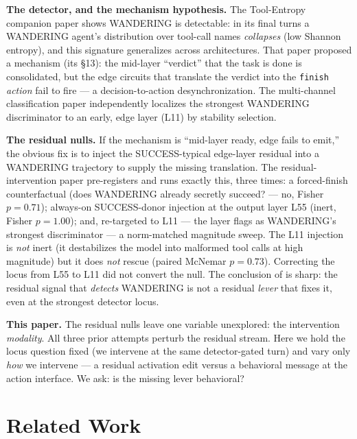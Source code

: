 \documentclass[11pt]{article}
\begin{document}
\textbf{The detector, and the mechanism hypothesis.} The Tool-Entropy companion paper \cite{tool_entropy} shows WANDERING is detectable: in its final turns a WANDERING agent's distribution over tool-call names \emph{collapses} (low Shannon entropy), and this signature generalizes across architectures. That paper proposed a mechanism (its \S13): the mid-layer ``verdict'' that the task is done is consolidated, but the edge circuits that translate the verdict into the \texttt{finish} \emph{action} fail to fire --- a decision-to-action desynchronization. The multi-channel classification paper \cite{multichannel} independently localizes the strongest WANDERING discriminator to an early, edge layer (L11) by stability selection.

\textbf{The residual nulls.} If the mechanism is ``mid-layer ready, edge fails to emit,'' the obvious fix is to inject the SUCCESS-typical edge-layer residual into a WANDERING trajectory to supply the missing translation. The residual-intervention paper \cite{residual_nulls} pre-registers and runs exactly this, three times: a forced-finish counterfactual (does WANDERING already secretly succeed? --- no, Fisher $p=0.71$); always-on SUCCESS-donor injection at the output layer L55 (inert, Fisher $p=1.00$); and, re-targeted to L11 --- the layer \cite{multichannel} flags as WANDERING's strongest discriminator --- a norm-matched magnitude sweep. The L11 injection is \emph{not} inert (it destabilizes the model into malformed tool calls at high magnitude) but it does \emph{not} rescue (paired McNemar $p=0.73$). Correcting the locus from L55 to L11 did not convert the null. The conclusion of \cite{residual_nulls} is sharp: the residual signal that \emph{detects} WANDERING is not a residual \emph{lever} that fixes it, even at the strongest detector locus.

\textbf{This paper.} The residual nulls leave one variable unexplored: the intervention \emph{modality}. All three prior attempts perturb the residual stream. Here we hold the locus question fixed (we intervene at the same detector-gated turn) and vary only \emph{how} we intervene --- a residual activation edit versus a behavioral message at the action interface. We ask: is the missing lever behavioral?

\section{Related Work}\label{sec:related}
\end{document}
